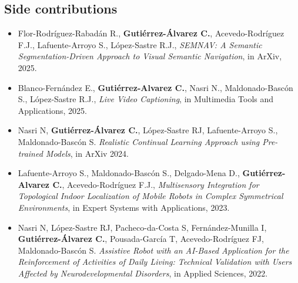\subsection{Side contributions}\label{subsec:side-contributions}

\begin{itemize}
    \item Flor-Rodríguez-Rabadán R., \textbf{Gutiérrez-Álvarez C.}, Acevedo-Rodríguez F.J., Lafuente-Arroyo S., López-Sastre R.J., \textit{SEMNAV: A Semantic Segmentation-Driven Approach to Visual Semantic Navigation}, in ArXiv, 2025.
    \item Blanco-Fernández E., \textbf{Gutiérrez-Alvarez C.}, Nasri N., Maldonado-Bascón S., López-Sastre R.J., \textit{Live Video Captioning}, in Multimedia Tools and Applications, 2025.
    \item Nasri N, \textbf{Gutiérrez-Álvarez C.}, López-Sastre RJ, Lafuente-Arroyo S., Maldonado-Bascón S. \textit{Realistic Continual Learning Approach using Pre-trained Models}, in ArXiv 2024.
    \item Lafuente-Arroyo S., Maldonado-Bascón S., Delgado-Mena D., \textbf{Gutiérrez-Alvarez C.}, Acevedo-Rodríguez F.J., \textit{Multisensory Integration for Topological Indoor Localization of Mobile Robots in Complex Symmetrical Environments}, in Expert Systems with Applications, 2023.
    \item Nasri N, López-Sastre RJ, Pacheco-da-Costa S, Fernández-Munilla I, \textbf{Gutiérrez-Álvarez C.}, Pousada-García T, Acevedo-Rodríguez FJ, Maldonado-Bascón S. \textit{Assistive Robot with an AI-Based Application for the Reinforcement of Activities of Daily Living: Technical Validation with Users Affected by Neurodevelopmental Disorders}, in Applied Sciences, 2022.
\end{itemize}
